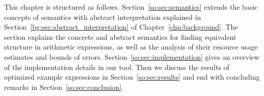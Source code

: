 This chapter is structured as follows.  Section~\ref{so:sec:semantics} extends
the basic concepts of semantics with abstract interpretation explained in
Section~\ref{bg:sec:abstract_interpretation} of Chapter~\ref{chp:background}.
The section explains the concrete and abstract semantics for finding equivalent
structure in arithmetic expressions, as well as the analysis of their resource
usage estimates and bounds of errors.  Section~\ref{so:sec:implementation}
gives an overview of the implementation details in our tool. Then we discuss
the results of optimized example expressions in Section~\ref{so:sec:results}
and end with concluding remarks in Section~\ref{so:sec:conclusion}.
